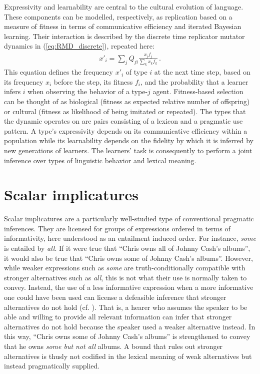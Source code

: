 \documentclass[a4paper]{article}
\begin{document}
Expressivity and learnability are central to the cultural evolution of language. These
components can be modelled, respectively, as replication based on a measure of fitness in terms
of communicative efficiency and iterated Bayesian learning. Their interaction is described by
the discrete time replicator mutator dynamics in (\ref{eq:RMD_discrete}), repeated here:
\begin{align*}
  x'_i = \sum_j Q_{ji} \frac{x_jf_j}{\sum_k x_k f_k}\,.
\end{align*}
This equation defines the frequency $x'_i$ of type $i$ at the next time step, based on its
frequency $x_i$ before the step, its fitness $f_i$, and the probability that a learner infers
$i$ when observing the behavior of a type-$j$ agent. Fitness-based selection can be thought of
as biological (fitness as expected relative number of offspring) or cultural (fitness as 
likelihood of being imitated or repeated). The types that the dynamic operates on are pairs
consisting of a lexicon and a pragmatic use pattern. A type's expressivity depends on its
communicative efficiency within a population while its learnability depends on the fidelity by
which it is inferred by new generations of learners. The learners' task is consequently to
perform a joint inference over types of linguistic behavior and lexical meaning.


\section{Scalar implicatures}\label{sec:si-case-study}
%
Scalar implicatures are a particularly well-studied type of conventional pragmatic inferences. They are licensed for groups of expressions ordered in terms of informativity, here understood as an entailment induced order. For instance, {\em some} is entailed by {\em all}. If it were true that ``Chris owns all of Johnny Cash's albums'', it would also be true that ``Chris owns some of Johnny Cash's albums''. However, while weaker expressions such as {\em some} are truth-conditionally compatible with stronger alternatives such as {\em all}, this is not what their use is normally taken to convey. Instead, the use of a less informative expression when a more informative one could have been used can license a defeasible inference that stronger alternatives do not hold (cf. \citealt{horn:1972,gazdar:1979}). That is, a hearer who assumes the speaker to be able and willing to provide all relevant information can infer that stronger alternatives do not hold because the speaker used a weaker alternative instead. In this way, ``Chris owns some of Johnny Cash's albums'' is strengthened to convey that he owns {\em some but not all} albums. A bound that rules out stronger alternatives is thusly not codified in the lexical meaning of weak alternatives but instead pragmatically supplied.
\end{document}
